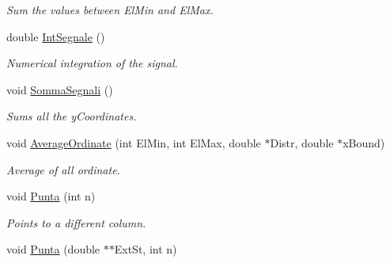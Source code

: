 \begin{DoxyCompactItemize}
\begin{DoxyCompactList}\small\item\em Sum the values between El\+Min and El\+Max. \end{DoxyCompactList}\item 
double \hyperlink{classVarDatFile_a43b771dc3214a9a36b2aa2a91ffb8edb}{Int\+Segnale} ()\hypertarget{classVarDatFile_a43b771dc3214a9a36b2aa2a91ffb8edb}{}\label{classVarDatFile_a43b771dc3214a9a36b2aa2a91ffb8edb}

\begin{DoxyCompactList}\small\item\em Numerical integration of the signal. \end{DoxyCompactList}\item 
void \hyperlink{classVarDatFile_a7a3685f3878bcb9e05a16bdadface9f9}{Somma\+Segnali} ()\hypertarget{classVarDatFile_a7a3685f3878bcb9e05a16bdadface9f9}{}\label{classVarDatFile_a7a3685f3878bcb9e05a16bdadface9f9}

\begin{DoxyCompactList}\small\item\em Sums all the y\+Coordinates. \end{DoxyCompactList}\item 
void \hyperlink{classVarDatFile_a982e54013ecdf9dcadead5247def28be}{Average\+Ordinate} (int El\+Min, int El\+Max, double $\ast$Distr, double $\ast$x\+Bound)\hypertarget{classVarDatFile_a982e54013ecdf9dcadead5247def28be}{}\label{classVarDatFile_a982e54013ecdf9dcadead5247def28be}

\begin{DoxyCompactList}\small\item\em Average of all ordinate. \end{DoxyCompactList}\item 
void \hyperlink{classVarDatFile_a9bb9fb6bb48e6c597ba31a271e1be613}{Punta} (int n)\hypertarget{classVarDatFile_a9bb9fb6bb48e6c597ba31a271e1be613}{}\label{classVarDatFile_a9bb9fb6bb48e6c597ba31a271e1be613}

\begin{DoxyCompactList}\small\item\em Points to a different column. \end{DoxyCompactList}\item 
void \hyperlink{classVarDatFile_ad2642e22b919be30857ed370e8d22acc}{Punta} (double $\ast$$\ast$Ext\+St, int n)\hypertarget{classVarDatFile_ad2642e22b919be30857ed370e8d22acc}{}\label{classVarDatFile_ad2642e22b919be30857ed370e8d22acc}


\end{DoxyCompactItemize}
